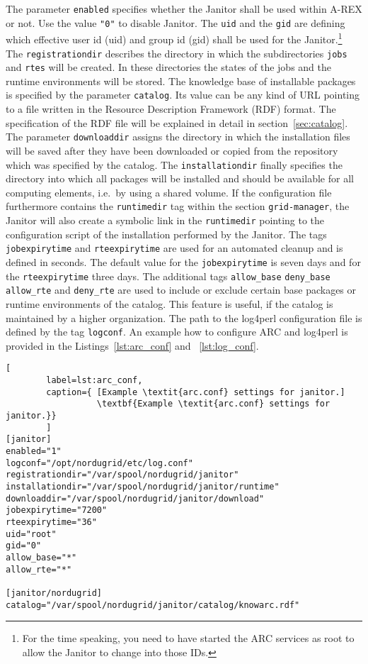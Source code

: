 The parameter \texttt{enabled} specifies whether the Janitor shall be used
within A-REX or not. Use the value \texttt{"0"} to disable Janitor. The
\texttt{uid} and the \texttt{gid} are defining which effective user id
(uid) and group id (gid) shall be used for the Janitor.\footnote{For
the time speaking, you need to have started the ARC services as root to
allow the Janitor to change into those IDs.} The \texttt{registrationdir}
describes the directory in which the subdirectories \texttt{jobs} and
\texttt{rtes} will be created.  In these directories the states of the
jobs and the runtime environments will be stored.  The knowledge base
of installable packages is specified by the parameter \texttt{catalog}.
Its value can be any kind of URL pointing to a file written in the
Resource Description Framework (RDF) format.  The specification of the
RDF file will be explained in detail in section~\ref{sec:catalog}.
The parameter \texttt{downloaddir} assigns the directory in which
the installation files will be saved after they have been downloaded
or copied from the repository which was specified by the catalog. The
\texttt{installationdir} finally specifies the directory into which all
packages will be installed and should be available for all computing
elements, i.e.\ by using a shared volume.  If the configuration file
furthermore contains the \texttt{runtimedir} tag within the section
\texttt{grid-manager}, the Janitor will also create a symbolic link
in the \texttt{runtimedir} pointing to the configuration script of the
installation performed by the Janitor.  The tags \texttt{jobexpirytime}
and \texttt{rteexpirytime} are used for an automated cleanup and is
defined in seconds.  The default value for the \texttt{jobexpirytime} is
seven days and for the \texttt{rteexpirytime} three days.  The additional
tags \texttt{allow\_base} \texttt{deny\_base} \texttt{allow\_rte} and
\texttt{deny\_rte} are used to include or exclude certain base packages
or runtime environments of the catalog. This feature is useful, if
the catalog is maintained by a higher organization.  The path to the
log4perl configuration file is defined by the tag \texttt{logconf}.
An example how to configure ARC and log4perl is provided in the
Listings~\ref{lst:arc_conf} and ~\ref{lst:log_conf}.

\begin{lstlisting}[
        label=lst:arc_conf,
        caption={ [Example \textit{arc.conf} settings for janitor.]
                  \textbf{Example \textit{arc.conf} settings for janitor.}}
        ]
[janitor]
enabled="1"
logconf="/opt/nordugrid/etc/log.conf"
registrationdir="/var/spool/nordugrid/janitor"
installationdir="/var/spool/nordugrid/janitor/runtime"
downloaddir="/var/spool/nordugrid/janitor/download"
jobexpirytime="7200"
rteexpirytime="36"
uid="root"
gid="0"
allow_base="*"
allow_rte="*"

[janitor/nordugrid]
catalog="/var/spool/nordugrid/janitor/catalog/knowarc.rdf"
\end{lstlisting}

